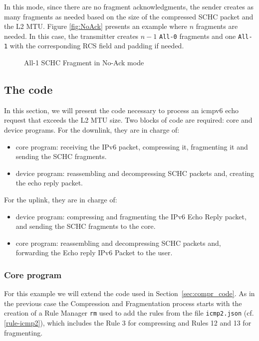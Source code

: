 In this mode, since there are no fragment acknowledgments, the sender creates as many fragments as needed based on the size of the compressed SCHC packet and the L2 MTU.
Figure \ref{fig:NoAck} presents an example where $n$ fragments are needed. 
In this case, the transmitter creates $n-1$ \texttt{All-0} fragments and one \texttt{All-1} with the corresponding RCS field and padding if needed.

\begin{figure}[!ht] 
    \centering 
    
    \caption{All-1 SCHC Fragment in No-Ack mode} 
    \label{fig-NoAck} 
\end{figure} 

\subsection{The code}

In this section, we will present the code necessary to process an icmpv6 echo request that exceeds the L2 MTU size. 
Two blocks of code are required: core and device programs. 
For the downlink, they are in charge of: 

\begin{itemize}
\item core program: receiving the IPv6 packet, compressing it, fragmenting it and sending the SCHC fragments.
\item device program: reassembling and decompressing SCHC packets and, creating the echo reply packet.
\end{itemize} 

For the uplink, they are in charge of: 

\begin{itemize}
\item device program: compressing and fragmenting the IPv6 Echo Reply packet, and sending the SCHC fragments to the core.
\item core program: reassembling and decompressing SCHC packets and, forwarding the Echo reply IPv6 Packet to the user.
\end{itemize} 


\subsubsection{Core program}

For this example we will extend the code used in Section~\ref{sec:compr_code}. 
As in the previous case the Compression and Fragmentation process starts with the creation of a Rule Manager \texttt{rm} used to add the rules from the file \texttt{icmp2.json} (cf. \vref{rule-icmp2}), which includes the Rule 3 for compressing and Rules 12 and 13 for fragmenting.

